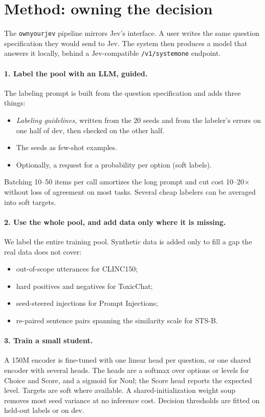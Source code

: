 \documentclass[11pt]{article}
\begin{document}
\section{Method: owning the decision}\label{sec:method}
The \texttt{ownyourjev} pipeline mirrors Jev's interface.
A user writes the same question specification they would send to Jev.
The system then produces a model that answers it locally, behind a Jev-compatible \texttt{/v1/systemone} endpoint.

\paragraph{1. Label the pool with an LLM, guided.}
The labeling prompt is built from the question specification and adds three things:
\begin{itemize}
  \item \emph{Labeling guidelines,} written from the 20 seeds and from the labeler's errors on one half of dev, then checked on the other half.
  \item The seeds as few-shot examples.
  \item Optionally, a request for a probability per option (soft labels).
\end{itemize}
Batching 10--50 items per call amortizes the long prompt and cut cost 10--20$\times$ without loss of agreement on most tasks.
Several cheap labelers can be averaged into soft targets.

\paragraph{2. Use the whole pool, and add data only where it is missing.}
We label the entire training pool. Synthetic data is added only to fill a gap the real data does not cover:
\begin{itemize}
  \item out-of-scope utterances for CLINC150;
  \item hard positives and negatives for ToxicChat;
  \item seed-steered injections for Prompt Injections;
  \item re-paired sentence pairs spanning the similarity scale for STS-B.
\end{itemize}

\paragraph{3. Train a small student.}
A 150M encoder is fine-tuned with one linear head per question, or one shared encoder with several heads.
The heads are a softmax over options or levels for Choice and Score, and a sigmoid for Noul; the Score head reports the expected level.
Targets are soft where available. A shared-initialization weight soup removes most seed variance at no inference cost.
Decision thresholds are fitted on held-out labels or on dev.
\end{document}
